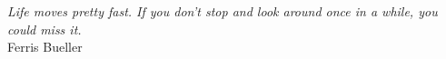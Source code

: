 
\chapter*{}
\vspace{15cm}
\begin{flushright}
	\textit
	{
		Life moves pretty fast. If you don't stop and look around once in a while, you could miss it.
	}\medskip\\
	Ferris Bueller
\end{flushright}
